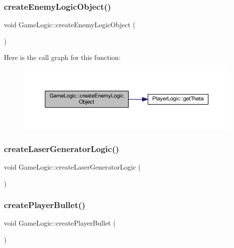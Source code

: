 \subsubsection{\texorpdfstring{create\+Enemy\+Logic\+Object()}{createEnemyLogicObject()}}
{\footnotesize\ttfamily void Game\+Logic\+::create\+Enemy\+Logic\+Object (\begin{DoxyParamCaption}{ }\end{DoxyParamCaption})}

Here is the call graph for this function\+:\nopagebreak
\begin{figure}[H]
\begin{center}
\leavevmode
\includegraphics[width=350pt]{class_game_logic_ad88d3d16d008722d8a85449beb1ed589_cgraph}
\end{center}
\end{figure}
\mbox{\label{class_game_logic_ae19f7458c9a738410d9c54a393346e35}} 
\subsubsection{\texorpdfstring{create\+Laser\+Generator\+Logic()}{createLaserGeneratorLogic()}}
{\footnotesize\ttfamily void Game\+Logic\+::create\+Laser\+Generator\+Logic (\begin{DoxyParamCaption}{ }\end{DoxyParamCaption})}

\mbox{\label{class_game_logic_a05dec53eb3c36cf1a669c973fa0b16ae}} 
\subsubsection{\texorpdfstring{create\+Player\+Bullet()}{createPlayerBullet()}}
{\footnotesize\ttfamily void Game\+Logic\+::create\+Player\+Bullet (\begin{DoxyParamCaption}{ }\end{DoxyParamCaption})}

